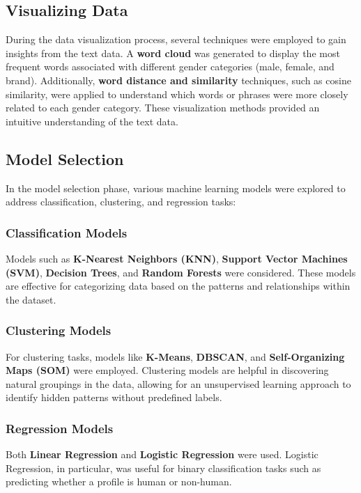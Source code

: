 \documentclass[a4paper,11pt]{article}
\begin{document}
\subsection{Visualizing Data}
During the data visualization process, several techniques were employed to gain insights from the text data. A \textbf{word cloud} was generated to display the most frequent words associated with different gender categories (male, female, and brand). Additionally, \textbf{word distance and similarity} techniques, such as cosine similarity, were applied to understand which words or phrases were more closely related to each gender category. These visualization methods provided an intuitive understanding of the text data.

\subsection{Model Selection}
In the model selection phase, various machine learning models were explored to address classification, clustering, and regression tasks:

\subsubsection*{Classification Models}
Models such as \textbf{K-Nearest Neighbors (KNN)}, \textbf{Support Vector Machines (SVM)}, \textbf{Decision Trees}, and \textbf{Random Forests} were considered. These models are effective for categorizing data based on the patterns and relationships within the dataset.

\subsubsection*{Clustering Models}
For clustering tasks, models like \textbf{K-Means}, \textbf{DBSCAN}, and \textbf{Self-Organizing Maps (SOM)} were employed. Clustering models are helpful in discovering natural groupings in the data, allowing for an unsupervised learning approach to identify hidden patterns without predefined labels.

\subsubsection*{Regression Models}
Both \textbf{Linear Regression} and \textbf{Logistic Regression} were used. Logistic Regression, in particular, was useful for binary classification tasks such as predicting whether a profile is human or non-human.
\end{document}
